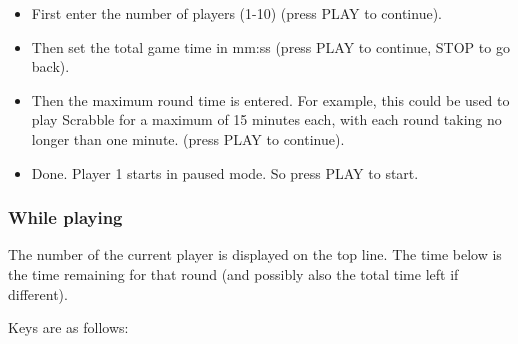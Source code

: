 \begin{itemize}
\item First enter the number of players (1{}-10) (press  PLAY to
continue). 
\item Then set the total game time in mm:ss (press PLAY to continue,
STOP to go back). 
\item Then the maximum round time is entered.  For example, this could
be used  to play Scrabble for a maximum of 15 minutes each, with each
round taking no longer than one minute. (press  PLAY to continue). 
\item Done. Player 1 starts in paused mode. So press PLAY to start.
\end{itemize}

\subsubsection{While playing}
The number of the current player is displayed on the top line. The time
below is the time remaining for that round (and possibly also the total
time left if different). 

Keys are as follows:

